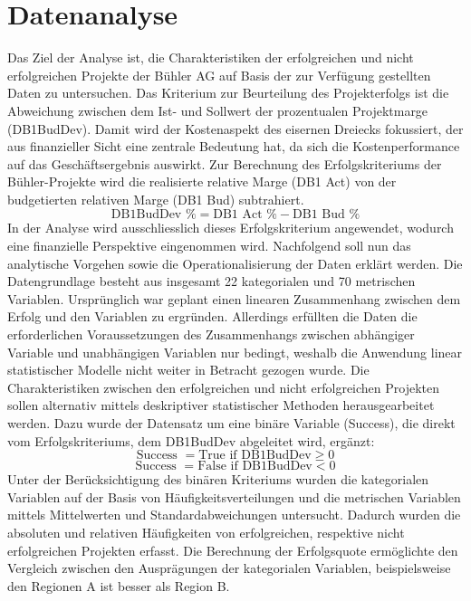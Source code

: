 \section{Datenanalyse}\label{sec:dataana}
Das Ziel der Analyse ist, die Charakteristiken der erfolgreichen und nicht erfolgreichen Projekte der Bühler AG auf Basis der zur Verfügung gestellten Daten zu untersuchen. Das Kriterium zur Beurteilung des Projekterfolgs ist die Abweichung zwischen dem Ist- und Sollwert der prozentualen Projektmarge (DB1BudDev). Damit wird der Kostenaspekt des eisernen Dreiecks fokussiert, der aus finanzieller Sicht eine zentrale Bedeutung hat, da sich die Kostenperformance auf das Geschäftsergebnis auswirkt. Zur Berechnung des Erfolgskriteriums der Bühler-Projekte wird die realisierte relative Marge (DB1 Act) von der budgetierten relativen Marge (DB1 Bud) subtrahiert. 
\begin{equation*}
\text{DB1BudDev \%} = \text{DB1 Act \%} - \text{DB1 Bud \%}
\end{equation*}
In der Analyse wird ausschliesslich dieses Erfolgskriterium angewendet, wodurch eine finanzielle Perspektive eingenommen wird. Nachfolgend soll nun das analytische Vorgehen sowie die Operationalisierung der Daten erklärt werden. 
\newline\newline
Die Datengrundlage besteht aus insgesamt 22 kategorialen und 70 metrischen Variablen. Ursprünglich war geplant einen linearen Zusammenhang zwischen dem Erfolg und den Variablen zu ergründen. Allerdings erfüllten die Daten die erforderlichen Voraussetzungen des Zusammenhangs zwischen abhängiger Variable und unabhängigen Variablen nur bedingt, weshalb die Anwendung linear statistischer Modelle nicht weiter in Betracht gezogen wurde. Die Charakteristiken zwischen den erfolgreichen und nicht erfolgreichen Projekten sollen alternativ mittels deskriptiver statistischer Methoden  herausgearbeitet werden. Dazu wurde der Datensatz um eine binäre Variable (Success), die direkt vom Erfolgskriteriums, dem DB1BudDev abgeleitet wird, ergänzt:
\begin{equation*}
\text{Success } = \text{True if } \text{DB1BudDev}\geq 0
\end{equation*}
\begin{equation*}
\text{Success } = \text{False if } \text{DB1BudDev} < 0
\end{equation*}
Unter der Berücksichtigung des binären Kriteriums wurden die kategorialen Variablen auf der Basis von Häufigkeitsverteilungen und die metrischen Variablen mittels Mittelwerten und Standardabweichungen untersucht. Dadurch wurden die absoluten und relativen Häufigkeiten von erfolgreichen, respektive nicht erfolgreichen Projekten erfasst. Die Berechnung der Erfolgsquote ermöglichte den Vergleich zwischen den Ausprägungen der kategorialen Variablen, beispielsweise den Regionen A ist besser als Region B.
